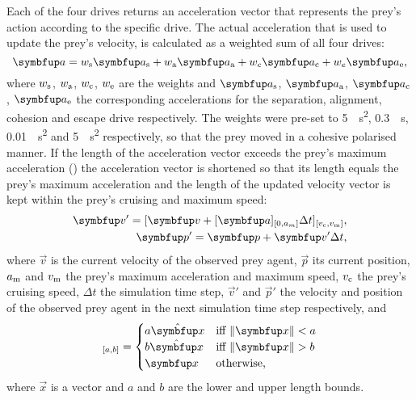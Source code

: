 Each of the four drives returns an acceleration vector that represents the prey's action according to the specific drive. The actual acceleration that is used to update the prey's velocity, is calculated as a weighted sum of all four drives:
%
\begin{equation}
  \vec{a}=w_\textnormal{s}\vec{a}_\textnormal{s}+w_\textnormal{a}\vec{a}_\textnormal{a}+w_c\vec{a}_\textnormal{c}+w_e\vec{a}_\textnormal{e},
\end{equation}
%
where $w_\textnormal{s}$, $w_\textnormal{a}$, $w_\textnormal{c}$, $w_\textnormal{e}$ are the weights and $\vec{a}_\textnormal{s}$, $\vec{a}_\textnormal{a}$, $\vec{a}_\textnormal{c}$, $\vec{a}_\textnormal{e}$ the corresponding accelerations for the separation, alignment, cohesion and escape drive respectively. The weights were pre-set to \SI{5}{\per\second\squared}, \SI{0.3}{\per\second}, \SI{0.01}{\per\second\squared} and \SI{5}{\per\second\squared} respectively, so that the prey moved in a cohesive polarised manner. If the length of the acceleration vector exceeds the prey's maximum acceleration () the acceleration vector is shortened so that its length equals the prey's maximum acceleration and the length of the updated velocity vector is kept within the prey's cruising and maximum speed:
%
\begin{eqnarray}
  \vec{v}'=[\vec{v}+[\vec{a}]_{[0,a_m]}\Delta t]_{[v_\textnormal{c},v_\textnormal{m}]},\\
  \label{eq:v}
  \vec{p}'= \vec{p} + \vec{v}'\Delta t,
\end{eqnarray}
%
where $\vec{v}$ is the current velocity of the observed prey agent, $\vec{p}$ its current position, $a_\textnormal{m}$ and $v_\textnormal{m}$ the prey's maximum acceleration and maximum speed, $v_\textnormal{c}$ the prey's cruising speed, $\Delta t$ the simulation time step, $\vec{v}'$ and $\vec{p}'$ the velocity and position of the observed prey agent in the next simulation time step respectively, and
%
\begin{equation}
  [\vec{x}]_{[a,b]} = \begin{cases}
    a\uvec{x} & \textnormal{iff}\ \|\vec{x}\| < a \\
    b\uvec{x} & \textnormal{iff}\ \|\vec{x}\| > b \\
    \vec{x} & \textnormal{otherwise,}
  \end{cases}
\end{equation}
%
where $\vec{x}$ is a vector and $a$ and $b$ are the lower and upper length bounds.

